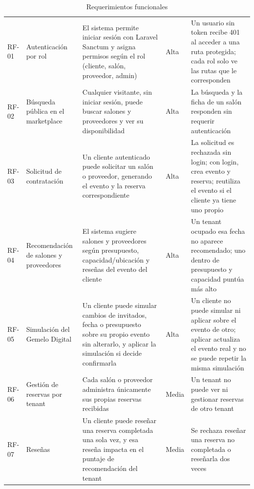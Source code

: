 \begin{table}[H]
    \centering
    \caption{Requerimientos funcionales}
    \label{tab:rf}
    \small
    \begin{tabularx}{\textwidth}{l L L l L}
        \toprule
         &  &  &  &  \\
        \midrule
        RF-01 & Autenticación por rol & El sistema permite iniciar sesión con Laravel Sanctum y asigna permisos según el rol (cliente, salón, proveedor, admin) & Alta & Un usuario sin token recibe 401 al acceder a una ruta protegida; cada rol solo ve las rutas que le corresponden \\
        RF-02 & Búsqueda pública en el marketplace & Cualquier visitante, sin iniciar sesión, puede buscar salones y proveedores y ver su disponibilidad & Alta & La búsqueda y la ficha de un salón responden sin requerir autenticación \\
        RF-03 & Solicitud de contratación & Un cliente autenticado puede solicitar un salón o proveedor, generando el evento y la reserva correspondiente & Alta & La solicitud es rechazada sin login; con login, crea evento y reserva; reutiliza el evento si el cliente ya tiene uno propio \\
        RF-04 & Recomendación de salones y proveedores & El sistema sugiere salones y proveedores según presupuesto, capacidad/ubicación y reseñas del evento del cliente & Alta & Un tenant ocupado esa fecha no aparece recomendado; uno dentro de presupuesto y capacidad puntúa más alto \\
        RF-05 & Simulación del Gemelo Digital & Un cliente puede simular cambios de invitados, fecha o presupuesto sobre su propio evento sin alterarlo, y aplicar la simulación si decide confirmarla & Alta & Un cliente no puede simular ni aplicar sobre el evento de otro; aplicar actualiza el evento real y no se puede repetir la misma simulación \\
        RF-06 & Gestión de reservas por tenant & Cada salón o proveedor administra únicamente sus propias reservas recibidas & Media & Un tenant no puede ver ni gestionar reservas de otro tenant \\
        RF-07 & Reseñas & Un cliente puede reseñar una reserva completada una sola vez, y esa reseña impacta en el puntaje de recomendación del tenant & Media & Se rechaza reseñar una reserva no completada o reseñarla dos veces \\
        \bottomrule
    \end{tabularx}
\end{table}

